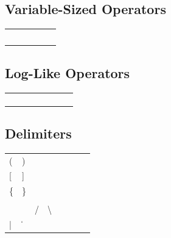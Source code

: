 \documentclass[11pt, a4paper, oneside]{article}
\theoremstyle{Plain}
\theoremstyle{Definition}
\theoremstyle{Remark}
\begin{document}
\begin{appendix}
	\subsection{Variable-Sized Operators \showfamily}

	\begin{tabular}{*6l}
	\X\sum          &\X\bigcap      &\X\bigodot     \\
	\X\prod         &\X\bigcup      &\X\bigotimes   \\
	\X\coprod       &\X\bigsqcup    &\X\bigoplus    \\
	\X\int          &\X\bigvee      &\X\biguplus    \\
	\X\oint         &\X\bigwedge
	\end{tabular}

	\subsection{Log-Like Operators \showfamily}

	\begin{tabular}{*8l}
	\Z\arccos &\Z\cos  &\Z\csc &\Z\exp &
	           \Z\ker    &\Z\limsup &\Z\min &\Z\sinh \\
	\Z\arcsin &\Z\cosh &\Z\deg &\Z\gcd &
	           \Z\lg     &\Z\ln     &\Z\Pr  &\Z\sup  \\
	\Z\arctan &\Z\cot  &\Z\det &\Z\hom &
	           \Z\lim    &\Z\log    &\Z\sec &\Z\tan  \\
	\Z\arg    &\Z\coth &\Z\dim &\Z\inf &
	           \Z\liminf &\Z\max    &\Z\sin &\Z\tanh
	\end{tabular}

	\subsection{Delimiters \showfamily}

	\begin{tabular}{*8l}
	\X(             &\X)            &\X\uparrow     &\X\Uparrow     \\
	\X[             &\X]            &\X\downarrow   &\X\Downarrow   \\
	\X\{            &\X\}           &\X\updownarrow &\X\Updownarrow \\
	\X\lfloor       &\X\rfloor      &\X\lceil       &\X\rceil       \\
	\X\langle       &\X\rangle      &\X/            &\X\backslash   \\
	\X|             &\X\|
	\end{tabular}


\end{appendix}
\end{document}
